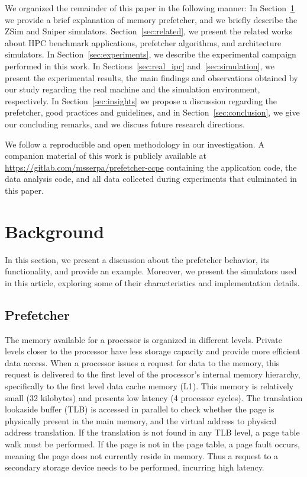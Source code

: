 \documentclass[AMA,final,STIX1COL]{WileyNJD-v2}
\def\COMPANION{{\scriptsize\url{https://gitlab.com/msserpa/prefetcher-ccpe}}\xspace}
\begin{document}
We organized the remainder of this paper in the following manner: 
In Section~\ref{sec:definitions} we provide a brief explanation of memory prefetcher, and we briefly describe the ZSim and Sniper simulators. 
Section~\ref{sec:related}, we present the related works about HPC benchmark applications, prefetcher algorithms, and architecture simulators. 
In Section~\ref{sec:experiments}, we describe the experimental campaign performed in this work. 
In Sections~\ref{sec:real_ipc} and~\ref{sec:simulation}, we present the experimental results, the main findings and observations obtained by our study regarding the real machine and the simulation environment, respectively.
In Section~\ref{sec:insights} we propose a discussion regarding the prefetcher, good practices and guidelines, and in Section~\ref{sec:conclusion}, we give our concluding remarks, and we discuss future research directions.

We follow a reproducible and open methodology in our investigation. A companion material of this work is publicly available at \COMPANION containing the application code, the data analysis code, and all data collected during experiments that culminated in this paper.

\section{Background}\label{sec:definitions}

In this section, we present a discussion about the prefetcher behavior, its functionality, and provide an example.
Moreover, we present the simulators used in this article, exploring some of their characteristics and implementation details.

\subsection{Prefetcher}

The memory available for a processor is organized in different levels.
Private levels closer to the processor have less storage capacity and provide more efficient data access. 
When a processor issues a request for data to the memory, this request is delivered to the first level of the processor's internal memory hierarchy, specifically to the first level data cache memory (L1).
This memory is relatively small (32 kilobytes) and presents low latency (4 processor cycles).
The translation lookaside buffer (TLB) is accessed in parallel to check whether the page is physically present in the main memory, and the virtual address to physical address translation.
If the translation is not found in any TLB level, a page table walk must be performed.
If the page is not in the page table, a page fault occurs, meaning the page does not currently reside in memory.
Thus a request to a secondary storage device needs to be performed, incurring high latency.
\end{document}
